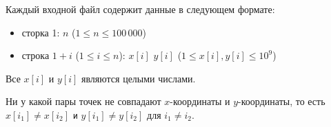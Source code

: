 Каждый входной файл содержит данные в следующем формате:
\begin{itemize}
\item сторка 1: $n$ ($1 \leq n \leq 100\,000$)
\item строка $1+i$ ($1 \leq i \leq n$): $x[i]$ $y[i]$ ($1 \leq x[i], y[i] \leq {10}^9$)
\end{itemize}

Все $x[i]$ и $y[i]$ являются целыми числами.

Ни у какой пары точек не совпадают $x$-координаты и $y$-координаты, то есть $x[i_1] \neq x[i_2]$ \texttt{и} $y[i_1] \neq y[i_2]$ для $i_1 \neq i_2$.